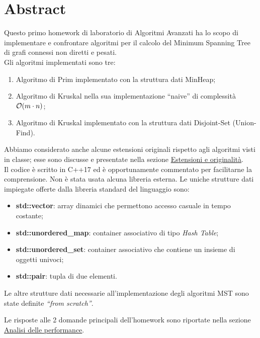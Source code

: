 \section{Abstract}
\label{cap:abstract}

Questo primo homework di laboratorio di Algoritmi Avanzati ha lo scopo di implementare e confrontare algoritmi per il calcolo del Minimum Spanning Tree di grafi connessi non diretti e pesati. \\

\noindent Gli algoritmi implementati sono tre:

\begin{enumerate}
    \item Algoritmo di Prim implementato con la struttura dati MinHeap;
    \item Algoritmo di Kruskal nella sua implementazione ``naive'' di complessità $\mathcal{O}(m \cdot n)$;
    \item Algoritmo di Kruskal implementato con la struttura dati Disjoint-Set (Union-Find).
\end{enumerate}

\noindent Abbiamo considerato anche alcune estensioni originali rispetto agli algoritmi visti in classe; esse sono discusse e presentate nella sezione \hyperref[cap:extensions-and-originalities]{Estensioni e originalità}. \\

\noindent Il codice è scritto in C++17 ed è opportunamente commentato per facilitarne la comprensione. Non è stata usata alcuna libreria esterna. Le uniche strutture dati impiegate offerte dalla libreria standard del linguaggio sono:

\begin{itemize}
    \item \textbf{std::vector}: array dinamici che permettono accesso casuale in tempo costante;
    \item \textbf{std::unordered\_map}: container associativo di tipo \textit{Hash Table};
    \item \textbf{std::unordered\_set}: container associativo che contiene un insieme di oggetti univoci;
    \item \textbf{std::pair}: tupla di due elementi.
\end{itemize}
Le altre strutture dati necessarie all'implementazione degli algoritmi MST sono state definite \textit{``from scratch''}.

\noindent Le risposte alle 2 domande principali dell'homework sono riportate nella sezione \hyperref[cap:performance-analysis]{Analisi delle performance}.
